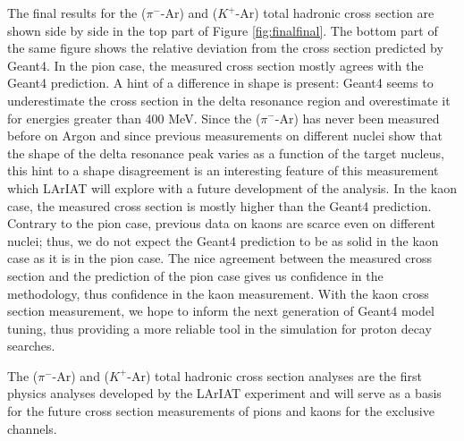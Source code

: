 The final results for the ($\pi^-$-Ar) and ($K^+$-Ar) total hadronic cross section are shown side by side in the top part of Figure \ref{fig:finalfinal}. The bottom part of the same figure shows the relative deviation from the cross section predicted by Geant4. In the pion case, the measured cross section mostly agrees with the Geant4 prediction. A hint of a difference in shape is present: Geant4 seems to underestimate the cross section in the delta resonance region and overestimate it for energies greater than 400 MeV. Since the   ($\pi^-$-Ar) has never been measured before on Argon and since previous measurements on different nuclei show that the shape of the delta resonance peak varies as a function of the target nucleus, this hint to a shape disagreement is an interesting feature of this measurement which LArIAT will explore with a future development of the analysis.
In the kaon case, the measured cross section is mostly higher than the Geant4 prediction. Contrary to the pion case, previous data on kaons are scarce even on different nuclei; thus, we do not expect the Geant4 prediction to be as solid in the kaon case as it is in the pion case. The nice agreement between the measured cross section and the prediction of the pion case gives us confidence in the methodology, thus confidence in the kaon measurement. With the kaon cross section measurement, we hope to inform the next generation of Geant4 model tuning, thus providing a more reliable tool in the simulation for proton decay searches.

The ($\pi^-$-Ar) and ($K^+$-Ar) total hadronic cross section analyses are the first physics analyses developed by the LArIAT experiment and  will serve as a basis for the future cross section measurements of pions and kaons for the exclusive channels.

